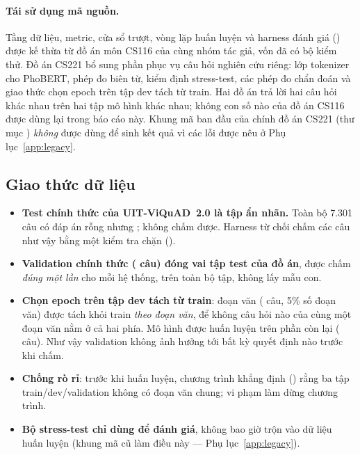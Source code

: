 \paragraph{Tái sử dụng mã nguồn.} Tầng dữ liệu, metric, cửa sổ trượt, vòng lặp huấn luyện và
harness đánh giá () được kế thừa từ đồ án môn CS116 của cùng nhóm tác giả, vốn
đã có bộ kiểm thử. Đồ án CS221 bổ sung phần phục vụ câu hỏi nghiên cứu riêng: lớp tokenizer
cho PhoBERT, phép đo biên từ, kiểm định stress-test, các phép đo chẩn đoán và giao thức chọn
epoch trên tập dev tách từ train. Hai đồ án trả lời hai câu hỏi khác nhau trên hai tập mô hình
khác nhau; không con số nào của đồ án CS116 được dùng lại trong báo cáo này. Khung mã ban đầu
của chính đồ án CS221 (thư mục ) \emph{không} được dùng để sinh kết quả vì các
lỗi được nêu ở Phụ lục~\ref{app:legacy}.

\subsection{Giao thức dữ liệu}
\label{sec:protocol}

\begin{itemize}
  \item \textbf{Test chính thức của UIT-ViQuAD~2.0 là tập ẩn nhãn.} Toàn bộ 7.301 câu có đáp
        án rỗng nhưng ; không chấm được. Harness từ chối chấm các
        câu như vậy bằng một kiểm tra chặn ().
  \item \textbf{Validation chính thức (\NVal{} câu) đóng vai tập test của đồ án}, được chấm
        \emph{đúng một lần} cho mỗi hệ thống, trên toàn bộ tập, không lấy mẫu con.
  \item \textbf{Chọn epoch trên tập dev tách từ train}: \NDevCtx{} đoạn văn (\NDev{} câu, 5\%
        số đoạn văn) được tách khỏi train \emph{theo đoạn văn}, để không câu hỏi nào của cùng
        một đoạn văn nằm ở cả hai phía. Mô hình được huấn luyện trên phần còn lại (\NFit{} câu).
        Như vậy validation không ảnh hưởng tới bất kỳ quyết định nào trước khi chấm.
  \item \textbf{Chống rò rỉ}: trước khi huấn luyện, chương trình khẳng định ()
        rằng ba tập train/dev/validation không có đoạn văn chung; vi phạm làm dừng chương trình.
  \item \textbf{Bộ stress-test chỉ dùng để đánh giá}, không bao giờ trộn vào dữ liệu huấn luyện
        (khung mã cũ làm điều này --- Phụ lục~\ref{app:legacy}).
\end{itemize}

